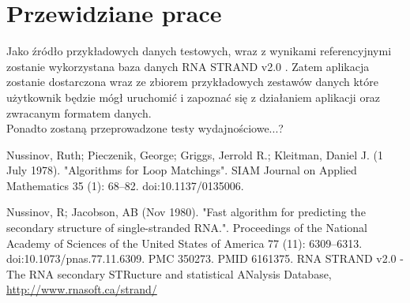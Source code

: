 \documentclass[paper=a4, fontsize=11pt]{scrartcl} %
\numberwithin{equation}{section} %
\numberwithin{figure}{section} %
\numberwithin{table}{section} %
\begin{document}
\section{Przewidziane prace}

Jako źródło przykładowych danych testowych, wraz z wynikami referencyjnymi zostanie wykorzystana baza danych RNA STRAND v2.0 \cite{bib:baza}. Zatem aplikacja zostanie dostarczona wraz ze zbiorem przykładowych zestawów danych które użytkownik będzie mógł uruchomić i zapoznać się z działaniem aplikacji oraz zwracanym formatem danych.\\

Ponadto zostaną przeprowadzone testy wydajnościowe...?

\renewcommand{\refname}{\normalfont\selectfont\normalsize Literatura i źródła} 


\begin{thebibliography}{1}

Nussinov, Ruth; Pieczenik, George; Griggs, Jerrold R.; Kleitman, Daniel J. (1 July 1978). "Algorithms for Loop Matchings". SIAM Journal on Applied Mathematics 35 (1): 68–82. doi:10.1137/0135006.

Nussinov, R; Jacobson, AB (Nov 1980). "Fast algorithm for predicting the secondary structure of single-stranded RNA.". Proceedings of the National Academy of Sciences of the United States of America 77 (11): 6309–6313. doi:10.1073/pnas.77.11.6309. PMC 350273. PMID 6161375.
RNA STRAND v2.0 - The RNA secondary STRucture and statistical ANalysis Database,
\url{http://www.rnasoft.ca/strand/}


\end{thebibliography}
\end{document}
